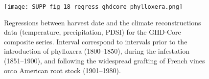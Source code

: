 \documentclass[12pt]{article}
\begin{document}
\begin{figure}
\center
\texttt{[image: SUPP\_fig\_18\_regress\_ghdcore\_phylloxera.png]}
\caption{Regressions between harvest date and the climate reconstructions data (temperature, precipitation, PDSI) for the GHD-Core composite series. Interval correspond to intervals prior to the introduction of phylloxera (1800--1850), during the infestation (1851--1900), and following the widespread grafting of French vines onto American root stock (1901--1980).}
\end{figure}
\end{document}
